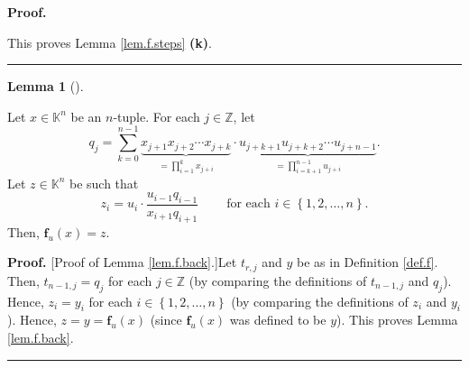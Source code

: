 \documentclass[numbers=enddot,12pt,final,onecolumn,notitlepage]{scrartcl}%
\theoremstyle{definition}
\newtheorem{lem}[theo]{Lemma}
\newenvironment{lemma}[1][]
{\begin{lem}[#1]\begin{leftbar}}
{\end{leftbar}\end{lem}}
\newenvironment{proof}[1][Proof]{\noindent\textbf{#1.} }{\ \rule{0.5em}{0.5em}}
\let\sumnonlimits\sum
\let\prodnonlimits\prod
\renewcommand{\sum}{\sumnonlimits\limits}
\renewcommand{\prod}{\prodnonlimits\limits}
\newenvironment{verlong}{}{}
\newenvironment{vershort}{}{}
\begin{document}
\begin{proof}
\begin{verlong}
\end{verlong}

\noindent This proves Lemma \ref{lem.f.steps} \textbf{(k)}.
\end{proof}

\begin{lemma}
\label{lem.f.back}Let $x\in\mathbb{K}^{n}$ be an $n$-tuple. For each
$j\in\mathbb{Z}$, let
\[
q_{j}=\sum_{k=0}^{n-1}\underbrace{x_{j+1}x_{j+2}\cdots x_{j+k}}_{=\prod
_{i=1}^{k}x_{j+i}}\cdot\underbrace{u_{j+k+1}u_{j+k+2}\cdots u_{j+n-1}}%
_{=\prod_{i=k+1}^{n-1}u_{j+i}}.
\]
Let $z\in\mathbb{K}^{n}$ be such that%
\[
z_{i}=u_{i}\cdot\dfrac{u_{i-1}q_{i-1}}{x_{i+1}q_{i+1}}%
\ \ \ \ \ \ \ \ \ \ \text{for each }i\in\left\{  1,2,\ldots,n\right\}  .
\]
Then, $\mathbf{f}_{u}\left(  x\right)  =z$.
\end{lemma}

\begin{vershort}


\begin{proof}
[Proof of Lemma \ref{lem.f.back}.]Let $t_{r,j}$ and $y$ be as in Definition
\ref{def.f}. Then, $t_{n-1,j}=q_{j}$ for each $j\in\mathbb{Z}$ (by comparing
the definitions of $t_{n-1,j}$ and $q_{j}$). Hence, $z_{i}=y_{i}$ for each
$i\in\left\{  1,2,\ldots,n\right\}  $ (by comparing the definitions of $z_{i}$
and $y_{i}$). Hence, $z=y=\mathbf{f}_{u}\left(  x\right)  $ (since
$\mathbf{f}_{u}\left(  x\right)  $ was defined to be $y$). This proves Lemma
\ref{lem.f.back}.
\end{proof}
\end{vershort}
\end{document}

